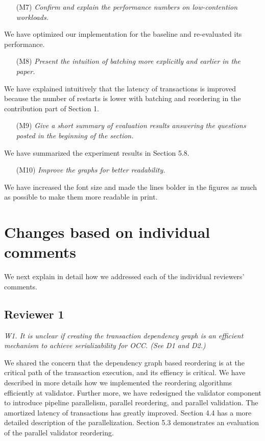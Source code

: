 \documentclass{article}
\begin{document}
\begin{itemize}
\item[(M7)] \emph{Confirm and explain the performance numbers on low-contention workloads.}
\end{itemize}
We have optimized our implementation for the baseline and re-evaluated its performance.

\begin{itemize}
\item[(M8)] \emph{Present the intuition of batching more explicitly and earlier in the paper. }
\end{itemize}
We have explained intuitively that the latency of transactions is improved because the number of restarts is lower with batching and reordering in the contribution part of Section 1.

\begin{itemize}
\item[(M9)] \emph{Give a short summary of evaluation results answering the questions posted in the beginning of the section.}
\end{itemize}
We have summarized the experiment results in Section 5.8.

\begin{itemize}
\item[(M10)] \emph{Improve the graphs for better readability.}
\end{itemize}
We have increased the font size and made the lines bolder in the figures as much as possible to make them more readable in print.

\section{Changes based on individual comments}

We next explain in detail how we addressed each of the individual reviewers' comments.

\subsection{Reviewer 1}

\emph{W1. It is unclear if creating the transaction dependency graph is an efficient mechanism to achieve serializability for OCC. (See D1 and D2.)}

\bigskip
We shared the concern that the dependency graph based reordering is at the critical path of the transaction execution, and its effiency is critical. We have described in more details how we implemented the reordering algorithms efficiently at validator. Further more, we have redesigned the validator component to introduce pipeline parallelism, parallel reordering, and parallel validation. The amortized latency of transactions has greatly improved. Section 4.4 has a more detailed description of the parallelization. Section 5.3 demonstrates an evaluation of the parallel validator reordering.
\bigskip
\end{document}
